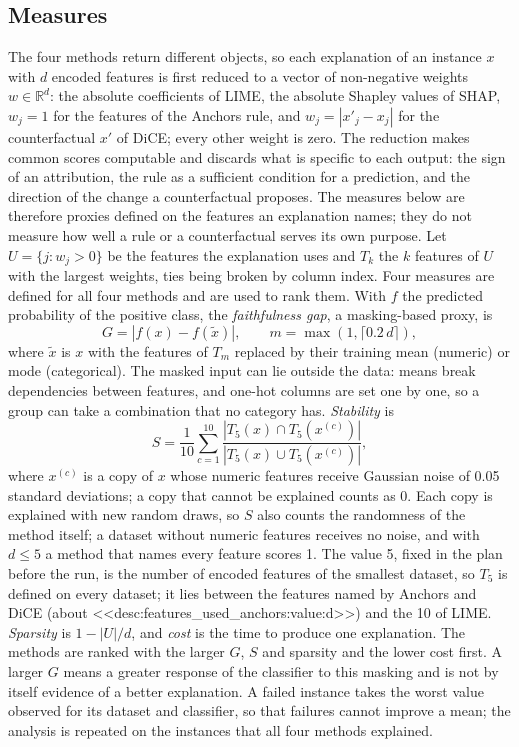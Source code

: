 \documentclass[10pt,a4paper,twocolumn]{article}
\begin{document}
\subsection{Measures}

The four methods return different objects, so each explanation of an instance $x$ with
$d$ encoded features is first reduced to a vector of non-negative weights
$w\in\mathbb{R}^{d}$: the absolute coefficients of LIME, the absolute Shapley values of
SHAP, $w_j=1$ for the features of the Anchors rule, and $w_j=|x'_j-x_j|$ for the
counterfactual $x'$ of DiCE; every other weight is zero. The reduction makes common
scores computable and discards what is specific to each output: the sign of an
attribution, the rule as a sufficient condition for a prediction, and the direction of
the change a counterfactual proposes. The measures below are therefore proxies defined
on the features an explanation names; they do not measure how well a rule or a
counterfactual serves its own purpose. Let $U=\{j: w_j>0\}$ be the features the
explanation uses and $T_k$ the $k$ features of $U$ with the largest weights, ties being
broken by column index. Four measures are defined for all four methods and are used to
rank them. With $f$ the predicted probability of the positive class, the
\textit{faithfulness gap}, a masking-based proxy, is
\begin{equation}
G=\left|f(x)-f(\tilde{x})\right|,\qquad m=\max(1,\lceil 0.2\,d\rceil),
\end{equation}
where $\tilde{x}$ is $x$ with the features of $T_m$ replaced by their training mean
(numeric) or mode (categorical). The masked input can lie outside the data: means break
dependencies between features, and one-hot columns are set one by one, so a group can
take a combination that no category has. \textit{Stability} is
\begin{equation}
S=\frac{1}{10}\sum_{c=1}^{10}\frac{|T_5(x)\cap T_5(x^{(c)})|}{|T_5(x)\cup T_5(x^{(c)})|},
\end{equation}
where $x^{(c)}$ is a copy of $x$ whose numeric features receive Gaussian noise of 0.05
standard deviations; a copy that cannot be explained counts as 0. Each copy is explained
with new random draws, so $S$ also counts the randomness of the method itself; a dataset
without numeric features receives no noise, and with $d\le 5$ a method that names every
feature scores 1. The value 5, fixed in the plan before the run, is the number of encoded
features of the smallest dataset, so $T_5$ is defined on every dataset; it lies between the
features named by Anchors and DiCE (about <<desc:features_used_anchors:value:d>>) and the 10
of LIME. \textit{Sparsity} is
$1-|U|/d$, and \textit{cost} is the time to produce one explanation. The methods are
ranked with the larger $G$, $S$ and sparsity and the lower cost first. A larger $G$ means
a greater response of the classifier to this masking and is not by itself evidence of a
better explanation. A failed instance takes the worst value observed
for its dataset and classifier, so that failures cannot improve a mean; the analysis is
repeated on the instances that all four methods explained.
\end{document}
